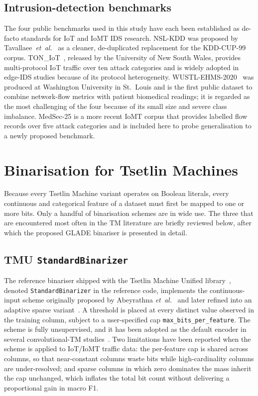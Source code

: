 \documentclass[journal,10pt]{IEEEtran}
\begin{document}
\subsection{Intrusion-detection benchmarks}
The four public benchmarks used in this study have each been
established as de-facto standards for IoT and IoMT IDS research.
NSL-KDD was proposed by Tavallaee~\emph{et~al.}~\cite{tavallaee2009nslkdd}
as a cleaner, de-duplicated replacement for the KDD-CUP-99 corpus.
TON\_IoT~\cite{moustafa2021ton}, released by the University of New
South Wales, provides multi-protocol IoT traffic over ten attack
categories and is widely adopted in edge-IDS studies because of its
protocol heterogeneity. WUSTL-EHMS-2020~\cite{hady2020wustl} was
produced at Washington University in St.~Louis and is the first
public dataset to combine network-flow metrics with patient biomedical
readings; it is regarded as the most challenging of the four because
of its small size and severe class imbalance. MedSec-25 is a more
recent IoMT corpus that provides labelled flow records over five
attack categories and is included here to probe generalisation to a
newly proposed benchmark.

\section{Binarisation for Tsetlin Machines}
\label{sec:binarisers}
\label{sec:glade}

Because every Tsetlin Machine variant operates on Boolean literals,
every continuous and categorical feature of a dataset must first be
mapped to one or more bits. Only a handful of binarisation schemes
are in wide use. The three that are encountered most often in the TM
literature are briefly reviewed below, after which the proposed GLADE
binariser is presented in detail.

\subsection{TMU \texttt{StandardBinarizer}}
\label{sec:bin-standard}
The reference binariser shipped with the Tsetlin Machine Unified
library~\cite{cair2024tmu}, denoted \texttt{StandardBinarizer} in the
reference code, implements the continuous-input scheme originally
proposed by Abeyrathna \emph{et~al.}~\cite{abeyrathna2019continuous} and
later refined into an adaptive sparse variant~\cite{abeyrathna2021adaptive}.
A threshold is placed at every distinct value observed in the training
column, subject to a user-specified cap
\texttt{max\_bits\_per\_feature}. The scheme is fully unsupervised, and
it has been adopted as the default encoder in several convolutional-TM
studies~\cite{granmo2019convolutional,bhattarai2023concise}. Two
limitations have been reported when the scheme is applied to IoT/IoMT
traffic data: the per-feature cap is shared across columns, so that
near-constant columns waste bits while high-cardinality columns are
under-resolved; and sparse columns in which zero dominates the mass
inherit the cap unchanged, which inflates the total bit count without
delivering a proportional gain in macro F1.
\end{document}

